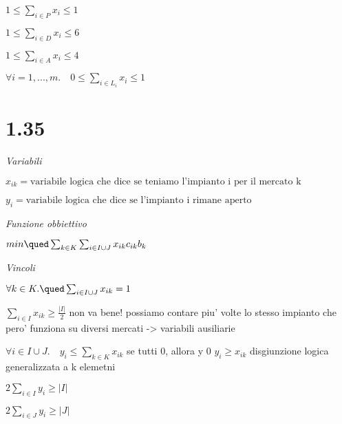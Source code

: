 $ 1 \leq \sum_{i \in P} x_i \leq 1 $

$ 1 \leq \sum_{i \in D} x_i \leq 6 $

$ 1 \leq \sum_{i \in A} x_i \leq 4 $

$ \forall i = 1,...,m. \quad 0 \leq \sum_{i \in L_i} x_i  \leq 1 $

\section{1.35}

\textit{Variabili}

$ x_{ik} = \text{variabile logica che dice se teniamo l'impianto i per il mercato k} $

$ y_i = \text{variabile logica che dice se l'impianto i rimane aperto} $


\textit{Funzione obbiettivo}

$ min \qued \sum_{k \in K} \sum_{i \in I \cup J} x_{ik} c_{ik} b_k $

\textit{Vincoli}

$ \forall k \in K. \qued \sum_{i \in I \cup J} x_{ik} = 1 $

$ \sum_{i \in I} x_{ik} \geq \frac{|I|}{2} $ non va bene! possiamo contare piu' volte lo stesso impianto che pero' funziona su diversi mercati -> variabili ausiliarie 

$ \forall i \in I \cup J.\quad y_i \leq \sum_{k \in K} x_{ik} $ se tutti 0, allora y 0
$ y_i \geq x_{ik} $ disgiunzione logica generalizzata a k elemetni

$2 \sum_{i \in I} y_i \geq |I| $

$2 \sum_{i \in J} y_i \geq |J| $


